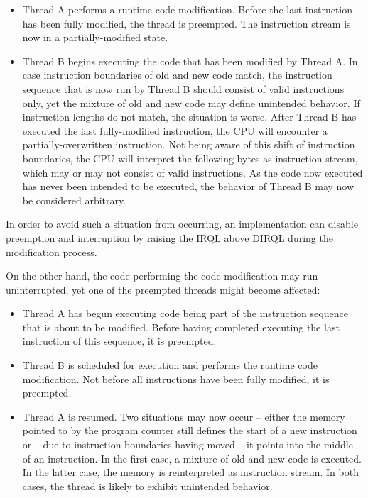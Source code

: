 \begin{itemize}
	\item Thread A performs a runtime code modification. Before the last instruction
		has been fully modified, the thread is preempted. The instruction stream is now in
		a partially-modified state.
	\item Thread B begins executing the code that has been modified by Thread A.
		In case instruction boundaries of old and new code match, the instruction sequence
		that is now run by Thread B should consist of valid instructions only, yet 
		the mixture of old and new code	may define unintended behavior. If instruction 
		lengths do not match, the situation is worse. After Thread B has executed the 
		last fully-modified instruction, the CPU will encounter a partially-overwritten
		instruction. Not being aware of this shift of instruction boundaries, the CPU 
		will interpret the following bytes as instruction stream, which may or may not consist
		of valid instructions. As the code now executed has never been intended to be executed,
		the behavior of Thread B may now be considered arbitrary.
\end{itemize}


In order to avoid such a situation from occurring, an implementation can disable preemption
and interruption by raising the IRQL above DIRQL during the modification
process. 

On the other hand, the code performing the code modification may run uninterrupted, yet one
of the preempted threads might become affected:

\begin{itemize}
	\item Thread A has begun executing code being part of the instruction sequence that is about
		to be modified. Before having completed executing the last instruction of this sequence,
		it is preempted.
	\item Thread B is scheduled for execution and performs the runtime code modification. Not 
		before all instructions have been fully modified, it is preempted.
	\item Thread A is resumed. Two situations may now occur -- either the memory pointed
		to by the program counter still defines the start of a new instruction or -- due to
		instruction boundaries having moved -- it points into the middle of an instruction. In
		the first case, a mixture of old and new code is executed. In the latter case, the memory
		is reinterpreted as instruction stream. In both cases, the thread is likely to 
		exhibit unintended behavior.
\end{itemize}

